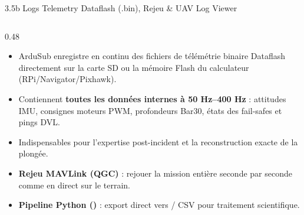 \begin{frame}{3.5b Logs Telemetry Dataflash (.bin), Rejeu \& UAV Log Viewer}
  \begin{columns}[T]
    \begin{column}{0.48\textwidth}
      \begin{block}{}
        \scriptsize
        \begin{itemize}
          \item ArduSub enregistre en continu des fichiers de télémétrie binaire Dataflash  directement sur la carte SD ou la mémoire Flash du calculateur (RPi/Navigator/Pixhawk).
          \item Contiennent \textbf{toutes les données internes à 50 Hz--400 Hz} : attitudes IMU, consignes moteurs PWM, profondeurs Bar30, états des fail-safes et pings DVL.
          \item Indispensables pour l'expertise post-incident et la reconstruction exacte de la plongée.
        \end{itemize}
      \end{block}

      \begin{block}{}
        \scriptsize
        \begin{itemize}
          \item \textbf{Rejeu MAVLink (QGC)} : rejouer la mission entière seconde par seconde comme en direct sur le terrain.
          \item \textbf{Pipeline Python ()} : export direct vers  / CSV pour traitement scientifique.
        \end{itemize}
      \end{block}
    \end{column}


\end{columns}
\end{frame}
